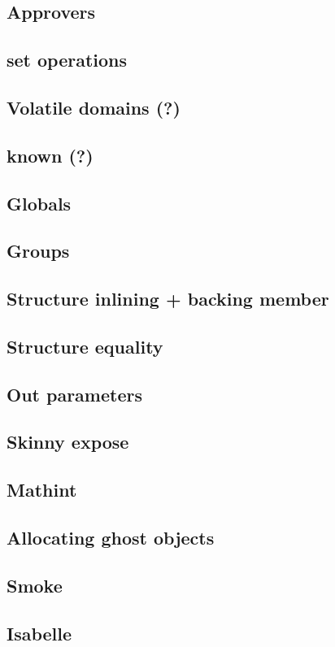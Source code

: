\subsection{Approvers}
\subsection{set operations}
\subsection{Volatile domains (?)}
\subsection{known (?)}

\subsection{Globals}
\subsection{Groups}
\subsection{Structure inlining + backing member}
\subsection{Structure equality}
\subsection{Out parameters}
\subsection{Skinny expose}
\subsection{Mathint}
\subsection{Allocating ghost objects}
\subsection{Smoke}
\subsection{Isabelle}
